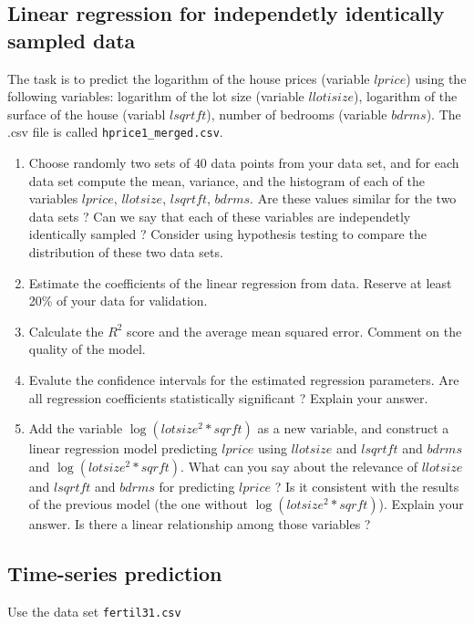 \documentclass{article}
\begin{document}
 \subsection*{Linear regression for independetly identically sampled data}
  The task is to predict the logarithm of the house prices (variable $lprice$) using the following variables:
  logarithm of the lot size (variable $llotisize$), logarithm of the surface of the house (variabl $lsqrtft$), number of bedrooms (variable $bdrms$). 	
   The .csv file is called \lstinline$hprice1_merged.csv$.


  \begin{enumerate}
   \item Choose randomly two sets of $40$ data points from your data set,  
	   and for each data set compute the mean, variance, and the histogram
	of each of the variables  $lprice$, $llotsize$, $lsqrtft$,  $bdrms$. 
	Are these values similar for the two data sets ?  Can we say that each of these variables are independetly identically sampled ? 
	Consider using hypothesis testing to compare the distribution of these two data sets.

  \item Estimate the coefficients of the linear regression from data. Reserve at least 20\% of your data for validation.
  \item Calculate the $R^2$ score and the average mean squared error. Comment on the quality of the model.
  \item Evalute the confidence intervals for the estimated regression parameters. Are all regression coefficients statistically significant ? Explain your answer. 
  \item Add the variable $\log(lotsize^2*sqrft)$ as a new variable, and construct a linear regression model predicting $lprice$ using
	 $llotsize$ and $lsqrtft$ and $bdrms$ and $\log(lotsize^2*sqrft)$. What can you say about the relevance of  $llotsize$ and $lsqrtft$ and $bdrms$
		  for predicting $lprice$ ? Is it consistent with the results of the previous model (the one without $\log(lotsize^2*sqrft)$).
		  Explain your answer. Is there a linear relationship among those variables ? 

  \end{enumerate}
 
 
 \subsection*{Time-series prediction}
 Use the data set  \lstinline$fertil31.csv$
\end{document}
